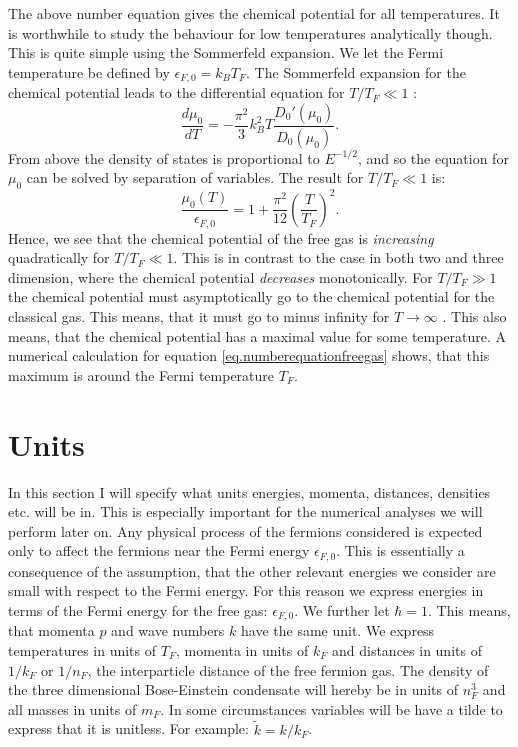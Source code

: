 The above number equation gives the chemical potential for all temperatures. It is worthwhile to study the behaviour for low temperatures analytically though. This is quite simple using the Sommerfeld expansion. We let the Fermi temperature be defined by $\epsilon_{F,0} = k_B T_F$. The Sommerfeld expansion for the chemical potential leads to the differential equation for $T/T_F \ll 1$ \cite{GiuseppeGiuseppe}:
\begin{equation}
\frac{d\mu_0}{dT} = -\frac{\pi^2}{3}k_B^2 T \frac{D_0'(\mu_0)}{D_0(\mu_0)}. \nonumber
\end{equation}
From above the density of states is proportional to $E^{-1/2}$, and so the equation for $\mu_0$ can be solved by separation of variables. The result for $T/T_F\ll 1$ is:
\begin{equation}
\frac{\mu_0(T)}{\epsilon_{F,0}} = 1 + \frac{\pi^2}{12}\left(\frac{T}{T_F}\right)^2.
\end{equation}
Hence, we see that the chemical potential of the free gas is \textit{increasing} quadratically for $T/T_F \ll 1$. This is in contrast to the case in both two and three dimension, where the chemical potential \textit{decreases} monotonically. For $T/T_F \gg 1$ the chemical potential must asymptotically go to the chemical potential for the classical gas. This means, that it must go to minus infinity for $T\to \infty$ \cite{SchroederThermal}. This also means, that the chemical potential has a maximal value for some temperature. A numerical calculation for equation \eqref{eq.numberequationfreegas} shows, that this maximum is around the Fermi temperature $T_F$. 

\section{Units}
In this section I will specify what units energies, momenta, distances, densities etc. will be in. This is especially important for the numerical analyses we will perform later on. Any physical process of the fermions considered is expected only to affect the fermions near the Fermi energy $\epsilon_{F,0}$. This is essentially a consequence of the assumption, that the other relevant energies we consider are small with respect to the Fermi energy. For this reason we express energies in terms of the Fermi energy for the free gas: $\epsilon_{F,0}$. We further let $\hbar = 1$. This means, that momenta $p$ and wave numbers $k$ have the same unit. We express temperatures in units of $T_F$, momenta in units of $k_F$ and distances in units of $1/k_F$ or $1/n_F$, the interparticle distance of the free fermion gas. The density of the three dimensional Bose-Einstein condensate will hereby be in units of $n_F^3$ and all masses in units of $m_F$. In some circumstances variables will be have a tilde to express that it is unitless. For example: $\tilde{k} = k/k_F$.


